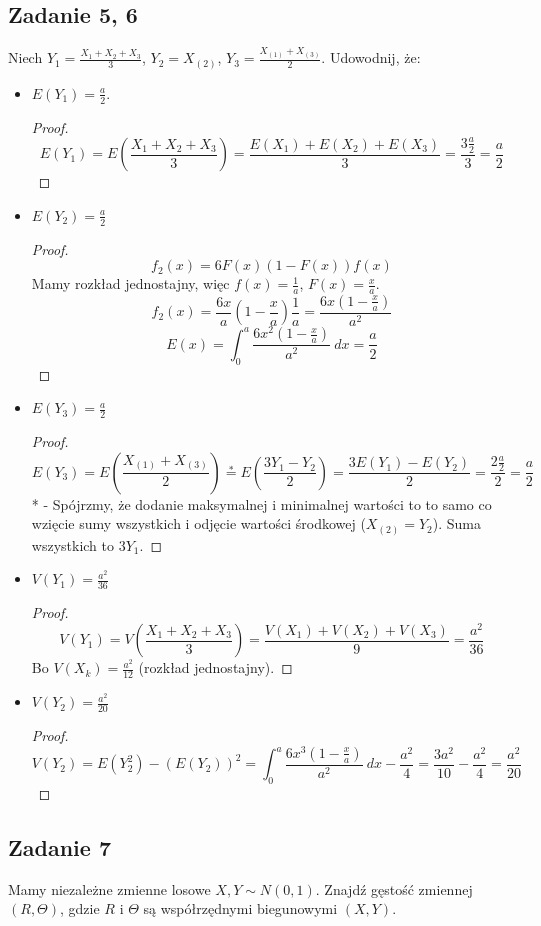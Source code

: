 \documentclass[a4paper]{article}
\begin{document}
\subsection*{Zadanie 5, 6}
Niech $Y_1=\frac{X_1+X_2+X_3}{3}$, $Y_2=X_{(2)}$, $Y_3=\frac{X_{(1)}+X_{(3)}}{2}$. Udowodnij, że:
\begin{itemize}
\item $E(Y_1)=\frac{a}{2}$.
\begin{proof}
$$E(Y_1)=E(\frac{X_1+X_2+X_3}{3})=\frac{E(X_1)+E(X_2)+E(X_3)}{3}=\frac{3\frac{a}{2}}{3}=\frac{a}{2}$$
\end{proof}
\item $E(Y_2)=\frac{a}{2}$
\begin{proof}
$$f_{2}(x)=6F(x)(1-F(x))f(x)$$
Mamy rozkład jednostajny, więc $f(x)=\frac{1}{a}$, $F(x)=\frac{x}{a}$.
$$f_{2}(x)=\frac{6x}{a}(1-\frac{x}{a})\frac{1}{a}=\frac{6x(1-\frac{x}{a})}{a^2} $$
$$E(x)=\int_0^a \frac{6x^2(1-\frac{x}{a})}{a^2} \ dx = \frac{a}{2}$$
\end{proof}
\item $E(Y_3)=\frac{a}{2}$
\begin{proof}
$$E(Y_3)=E(\frac{X_{(1)}+X_{(3)}}{2})\stackrel{*}{=}E(\frac{3Y_1-Y_2}{2})=\frac{3E(Y_1)-E(Y_2)}{2}=\frac{2\frac{a}{2}}{2}=\frac{a}{2}$$
* - Spójrzmy, że dodanie maksymalnej i minimalnej wartości to to samo co wzięcie sumy wszystkich i odjęcie wartości środkowej ($X_{(2)}=Y_2$). Suma wszystkich to $3Y_1$.
\end{proof}
\item $V(Y_1)=\frac{a^2}{36}$
\begin{proof}
$$V(Y_1)=V(\frac{X_1+X_2+X_3}{3})=\frac{V(X_1)+V(X_2)+V(X_3)}{9}=\frac{a^2}{36} $$
Bo $V(X_k)=\frac{a^2}{12}$ (rozkład jednostajny).
\end{proof}
\item $V(Y_2)=\frac{a^2}{20}$
\begin{proof}
$$V(Y_2)=E(Y_2^2)-(E(Y_2))^2=\int_0^a \frac{6x^3(1-\frac{x}{a})}{a^2} \ dx - \frac{a^2}{4} = \frac{3a^2}{10} - \frac{a^2}{4} = \frac{a^2}{20} $$
\end{proof}
\end{itemize} 

\subsection*{Zadanie 7}
Mamy niezależne zmienne losowe $X,Y\sim N(0,1)$. Znajdź gęstość zmiennej $(R,\Theta)$, gdzie $R$ i $\Theta$ są współrzędnymi biegunowymi $(X,Y)$.
\end{document}
